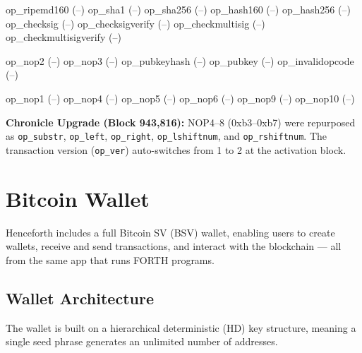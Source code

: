 \documentclass[a4paper, 11pt, openany]{book}
\begin{document}
\begin{forthbox}
  op_ripemd160             (--)
  op_sha1                  (--)
  op_sha256                (--)
  op_hash160               (--)
  op_hash256               (--)
  op_checksig              (--)
  op_checksigverify        (--)
  op_checkmultisig         (--)
  op_checkmultisigverify   (--)
\end{forthbox}

\begin{forthbox}
  op_nop2           (--)
  op_nop3           (--)
  op_pubkeyhash     (--)
  op_pubkey         (--)
  op_invalidopcode  (--)
\end{forthbox}

\begin{forthbox}
  op_nop1    (--)
  op_nop4    (--)
  op_nop5    (--)
  op_nop6    (--)
  op_nop9    (--)
  op_nop10   (--)
\end{forthbox}

\begin{notebox}
\textbf{Chronicle Upgrade (Block 943,816):} NOP4--8 (0xb3--0xb7) were repurposed as \texttt{op\_substr}, \texttt{op\_left}, \texttt{op\_right}, \texttt{op\_lshiftnum}, and \texttt{op\_rshiftnum}. The transaction version (\texttt{op\_ver}) auto-switches from 1 to 2 at the activation block.
\end{notebox}

\chapter{Bitcoin Wallet}

Henceforth includes a full Bitcoin SV (BSV) wallet, enabling users to create wallets, receive and send transactions, and interact with the blockchain --- all from the same app that runs FORTH programs.

\section{Wallet Architecture}

The wallet is built on a hierarchical deterministic (HD) key structure, meaning a single seed phrase generates an unlimited number of addresses.
\end{document}
